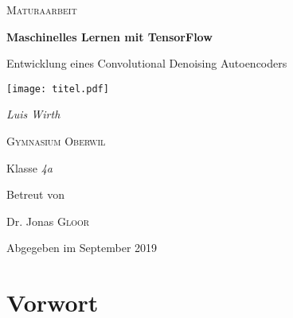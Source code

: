 
\begin{titlepage}
  \pagecolor{black}
  \color{white}

  \centering

  {\scshape\LARGE Maturaarbeit\par}
  \vspace{1cm}
  {\huge\bfseries Maschinelles Lernen mit TensorFlow\par}
  \vspace{0.2cm}
  {\large Entwicklung eines Convolutional Denoising Autoencoders\par}
  \vfill
  \texttt{[image: titel.pdf]} \par
  \vspace{1cm}
  {\LARGE\itshape Luis Wirth\par}
  \vfill
  \vspace{2cm}
  {\scshape\Large Gymnasium Oberwil\par}
  {\large Klasse \textit{4a}\par}
  \vspace{2cm}
  Betreut von\par
  Dr. Jonas \textsc{Gloor}

  \vfill
  {\large Abgegeben im September 2019\par}
\end{titlepage}

\pagecolor{pagecolor}
\color{textcolor}

\tableofcontents

\pagebreak


\chapter*{Vorwort}

